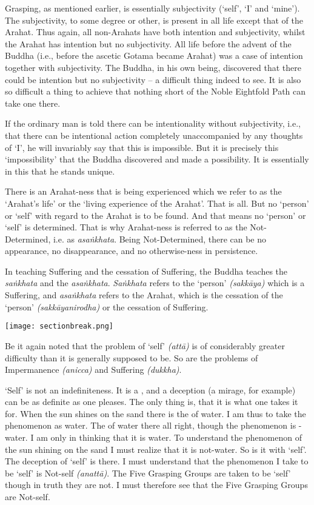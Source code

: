 Grasping, as mentioned earlier, is essentially subjectivity (`self', `I' and `mine'). The subjectivity, to some degree or other, is present in all life except that of the Arahat. Thus again, all non-Arahats have both intention and subjectivity, whilst the Arahat has intention but no subjectivity. All life before the advent of the Buddha (i.e., before the ascetic Gotama became Arahat) was a case of intention together with subjectivity. The Buddha, in his own being, discovered that there could be intention but no subjectivity -- a difficult thing indeed to see. It is also so difficult a thing to achieve that nothing short of the Noble Eightfold Path can take one there.

If the ordinary man is told there can be intentionality without subjectivity, i.e., that there can be intentional action completely unaccompanied by any thoughts of `I', he will invariably say that this is impossible. But it is precisely this `impossibility' that the Buddha discovered and made a possibility. It is essentially in this that he stands unique.

There is an Arahat-ness that is being experienced which we refer to as the `Arahat's life' or the `living experience of the Arahat'. That is all. But no `person' or `self' with regard to the Arahat is to be found. And that means no `person' or `self' is determined. That is why Arahat-ness is referred to as the Not-Determined, i.e. as \emph{asaṅkhata}. Being Not-Determined, there can be no appearance, no disappearance, and no otherwise-ness in persistence.

In teaching Suffering and the cessation of Suffering, the Buddha teaches the \emph{saṅkhata} and the \emph{asaṅkhata}. \emph{Saṅkhata} refers to the `person' \emph{(sakkāya)} which is a Suffering, and \emph{asaṅkhata} refers to the Arahat, which is the cessation of the `person' \emph{(sakkāyanirodha)} or the cessation of Suffering.

\texttt{[image: sectionbreak.png]}

Be it again noted that the problem of `self' \emph{(attā)} is of considerably greater difficulty than it is generally supposed to be. So are the problems of Impermanence \emph{(anicca)} and Suffering \emph{(dukkha)}.

`Self' is not an indefiniteness. It is a , and a deception (a mirage, for example) can be as definite as one pleases. The only thing is, that it is  what one takes it for. When the sun shines on the sand there is the  of water. I am thus  to take the phenomenon as water. The  of water  there all right, though the phenomenon is -water. I am only  in thinking that it is water. To understand the phenomenon of the sun shining on the sand I must realize that it is not-water. So is it with `self'. The deception of `self' is there. I must understand that the phenomenon I take to be `self' is Not-self \emph{(anattā)}. The Five Grasping Groups are taken to be `self' though in truth they are not. I must therefore see that the Five Grasping Groups are Not-self.

